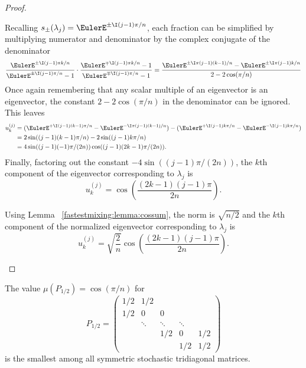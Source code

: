 \documentclass[12pt]{article}
\begin{document}
\begin{proof}
\begin{enumerate}
            Recalling \( s_{\pm}(\lambda_j) = \EulerE^{\pm \I (j-1)\pi/n}
            \), each fraction can be simplified by multiplying numerator
            and denominator by the complex conjugate of the denominator
            \[
                \frac{\EulerE^{\pm \I (j-1) \pi k/n}}{\EulerE^{\pm \I (j-1)
                \pi/n} - 1} \cdot \frac{\EulerE^{\mp \I (j-1) \pi k/n}-1}
                {\EulerE^{\mp \I (j-1) \pi/n} - 1} = \frac{\EulerE^{\pm
                \I \pi (j-1) (k-1)/n} - \EulerE^{\pm \I \pi (j-1) k/n}}{2-
                2\cos(\pi/n)}
            \] Once again remembering that any scalar multiple of an
            eigenvector is an eigenvector, the constant \( 2- 2\cos(\pi/n)
            \) in the denominator can be ignored.  This leaves
            \begin{align*}
                u_k^{(j)} &= (\EulerE^{+ \I (j-1)(k-1)\pi/n} - \EulerE^{-
                \I \pi (j-1)(k-1)/n}) - (\EulerE^{+ \I (j-1) k \pi /n} -
                \EulerE^{- \I (j-1) k \pi /n}) \\
                &= 2\sin( (j-1) (k-1) \pi /n) - 2\sin( (j-1) k\pi /n) \\
                &= 4 \sin( (j-1) (-1) \pi/(2n)) \cos((j-1) (2k-1) \pi /(2n)
                ).
            \end{align*}
            Finally, factoring out the constant \( -4 \sin( (j-1)\pi/(2n))
            \), the \( k \)th component of the eigenvector corresponding
            to \( \lambda_j \) is
            \[
                u^{(j)}_k = \cos\left( \frac{(2k-1)(j-1)\pi}{2n} \right).
            \]

            Using Lemma~%
            \ref{fastestmixing:lemma:cossum}, the norm is \( \sqrt{n/2} \)
            and the \( k \)th component of the normalized eigenvector
            corresponding to \( \lambda_j \) is
            \[
                u^{(j)}_k = \sqrt{\frac{2}{n}} \cos\left( \frac{(2k-1)(j-1)\pi}
                {2n} \right).
            \]
    \end{enumerate}
\end{proof}

\begin{theorem}
    \label{fastestmixing:theorem:main} The value \( \mu(P_{1/2}) = \cos(\pi/n)
    \) for
    \[
        P_{1/2} =
        \begin{pmatrix}
            1/2 & 1/2 & & & \\
            1/2 & 0 & 0 & & \\
            & \ddots & \ddots & \ddots& \\
            & & 1/2 & 0 & 1/2 \\
            & & & 1/2 & 1/2
        \end{pmatrix}
    \] is the smallest among all symmetric stochastic tridiagonal
    matrices.
\end{theorem}
\end{document}
